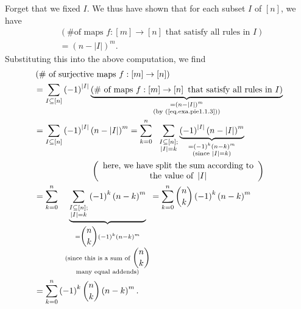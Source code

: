 Forget that we fixed $I$. We thus have shown that for each subset $I$ of
$\left[  n\right]  $, we have%
\begin{align}
&  \left(  \text{\# of maps }f:\left[  m\right]  \rightarrow\left[  n\right]
\text{ that satisfy all rules in }I\right) \nonumber\\
&  =\left(  n-\left\vert I\right\vert \right)  ^{m}. \label{eq.exa.pie1.1.3}%
\end{align}
Substituting this into the above computation, we find%
\begin{align*}
&  \left(  \text{\# of surjective maps }f:\left[  m\right]  \rightarrow\left[
n\right]  \right) \\
&  =\sum_{I\subseteq\left[  n\right]  }\left(  -1\right)  ^{\left\vert
I\right\vert }\underbrace{\left(  \text{\# of maps }f:\left[  m\right]
\rightarrow\left[  n\right]  \text{ that satisfy all rules in }I\right)
}_{\substack{=\left(  n-\left\vert I\right\vert \right)  ^{m}\\\text{(by
(\ref{eq.exa.pie1.1.3}))}}}\\
&  =\sum_{I\subseteq\left[  n\right]  }\left(  -1\right)  ^{\left\vert
I\right\vert }\left(  n-\left\vert I\right\vert \right)  ^{m}=\sum_{k=0}%
^{n}\ \ \sum_{\substack{I\subseteq\left[  n\right]  ;\\\left\vert I\right\vert
=k}}\underbrace{\left(  -1\right)  ^{\left\vert I\right\vert }\left(
n-\left\vert I\right\vert \right)  ^{m}}_{\substack{=\left(  -1\right)
^{k}\left(  n-k\right)  ^{m}\\\text{(since }\left\vert I\right\vert
=k\text{)}}}\\
&  \ \ \ \ \ \ \ \ \ \ \ \ \ \ \ \ \ \ \ \ \left(
\begin{array}
[c]{c}%
\text{here, we have split the sum according to}\\
\text{the value of }\left\vert I\right\vert
\end{array}
\right) \\
&  =\sum_{k=0}^{n}\ \ \underbrace{\sum_{\substack{I\subseteq\left[  n\right]
;\\\left\vert I\right\vert =k}}\left(  -1\right)  ^{k}\left(  n-k\right)
^{m}}_{\substack{=\dbinom{n}{k}\left(  -1\right)  ^{k}\left(  n-k\right)
^{m}\\\text{(since this is a sum of }\dbinom{n}{k}\\\text{many equal
addends)}}}=\sum_{k=0}^{n}\dbinom{n}{k}\left(  -1\right)  ^{k}\left(
n-k\right)  ^{m}\\
&  =\sum_{k=0}^{n}\left(  -1\right)  ^{k}\dbinom{n}{k}\left(  n-k\right)
^{m}.
\end{align*}


